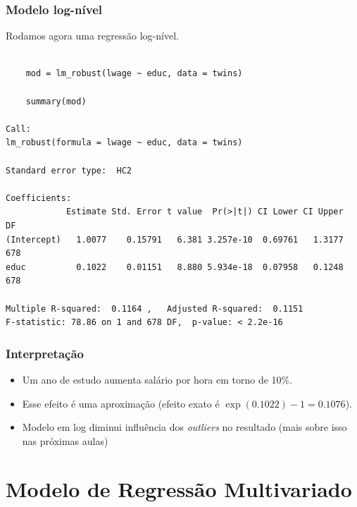 \documentclass[10pt,slides,xcolor=pdftex,dvipsnames,table]{beamer}
\begin{document}

\begin{frame}[fragile]
	\frametitle{Modelo log-nível}

\vspace{0.5cm}
Rodamos agora uma regressão log-nível.

\begin{lstlisting}

	mod = lm_robust(lwage ~ educ, data = twins)
	
	summary(mod)
	
Call:
lm_robust(formula = lwage ~ educ, data = twins)

Standard error type:  HC2 

Coefficients:
            Estimate Std. Error t value  Pr(>|t|) CI Lower CI Upper  DF
(Intercept)   1.0077    0.15791   6.381 3.257e-10  0.69761   1.3177 678
educ          0.1022    0.01151   8.880 5.934e-18  0.07958   0.1248 678

Multiple R-squared:  0.1164 ,	Adjusted R-squared:  0.1151 
F-statistic: 78.86 on 1 and 678 DF,  p-value: < 2.2e-16

\end{lstlisting}

\end{frame}


\begin{frame}[fragile]
	\frametitle{Interpretação}

\begin{itemize}\itemsep1.2em

\item Um ano de estudo aumenta salário por hora em torno de 10\%. 

\item Esse efeito é uma aproximação (efeito exato é $\exp(0.1022)-1 = 0.1076$).

\item Modelo em log diminui influência dos \textit{outliers} no resultado (mais sobre isso nas próximas aulas)  

\end{itemize}

\end{frame}


\section{Modelo de Regressão Multivariado}
\end{document}
